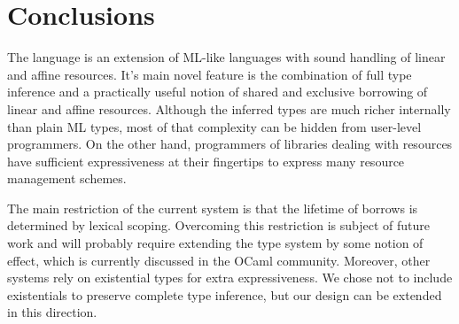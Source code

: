 
\section{Conclusions}
\label{sec:conclusions}

The \lang language is an extension of ML-like languages with sound handling of linear and affine resources. It's main novel feature is the combination of full type inference and a practically useful notion of shared and exclusive borrowing of linear and affine resources.
Although the inferred types are much richer internally than plain ML types, most of that complexity can be hidden from user-level programmers. On the other hand, programmers of libraries dealing with resources have sufficient expressiveness at their fingertips to express many resource management schemes.

The main restriction of the current system is that the lifetime of borrows is determined by lexical scoping. Overcoming this restriction is subject of future work and will probably require extending the type system by some notion of effect, which is currently discussed in the OCaml community. 
Moreover, other systems rely on existential types for extra expressiveness. We chose not to include existentials to preserve complete type inference, but our design can be extended in this direction. 

